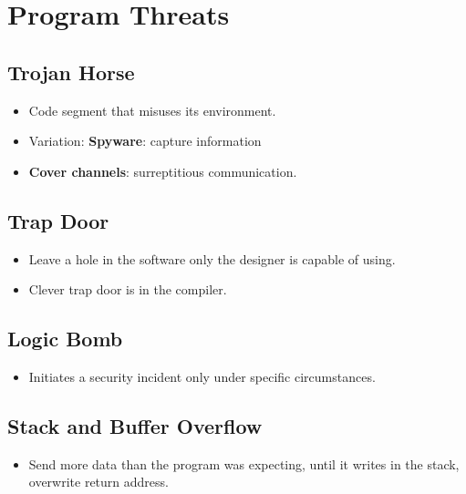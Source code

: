 \documentclass[10pt]{report}
\begin{document}
	\section{Program Threats}
		\subsection{Trojan Horse}
			\begin{itemize}
				\item Code segment that misuses its environment.
				\item Variation: \textbf{Spyware}: capture information
				\item \textbf{Cover channels}: surreptitious communication.
			\end{itemize}

		\subsection{Trap Door}
			\begin{itemize}
				\item Leave a hole in the software only the designer is capable of using.
				\item Clever trap door is in the compiler.
			\end{itemize}

		\subsection{Logic Bomb}
			\begin{itemize}
				\item Initiates a security incident only under specific circumstances.
			\end{itemize}

		\subsection{Stack and Buffer Overflow}
			\begin{itemize}
				\item Send more data than the program was expecting, until it writes in the stack, overwrite return address.
			\end{itemize}
\end{document}
